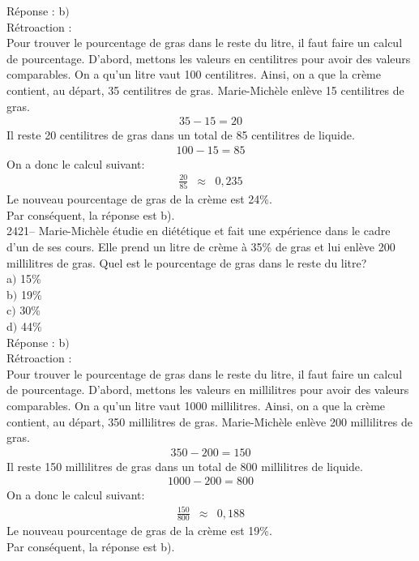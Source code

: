 \documentclass[letterpaper, 12pt]{article}
\begin{document}
R\'eponse : b$)$\\

R\'etroaction :\\
Pour trouver le pourcentage de gras dans le reste du litre, il faut faire un calcul de pourcentage. D'abord, mettons les valeurs en centilitres pour avoir des valeurs comparables. On a qu'un litre vaut 100 centilitres. Ainsi, on a que la cr\`eme contient, au d\'epart, 35 centilitres de gras. Marie-Mich\`ele enl\`eve 15 centilitres de gras.
\begin{eqnarray*}
 35-15=20
\end{eqnarray*}
Il reste 20 centilitres de gras dans un total de 85 centilitres de liquide.
\begin{eqnarray*}
100-15=85
\end{eqnarray*}
On a donc le calcul suivant:
\begin{eqnarray*}
 \frac{20}{85}&\approx&0,235
\end{eqnarray*}
Le nouveau pourcentage de gras de la cr\`eme est 24\%.\\
Par cons\'equent, la r\'eponse est b).\\

2421-- Marie-Mich\`ele \'etudie en di\'et\'etique et fait une exp\'erience dans le cadre d'un de ses cours. Elle prend un litre de cr\`eme \`a 35\% de gras et lui enl\`eve 200 millilitres de gras. Quel est le pourcentage de gras dans le reste du litre?\\

a$)$ 15\%\\
b$)$ 19\%\\
c$)$ 30\%\\
d$)$ 44\%\\

R\'eponse : b$)$\\

R\'etroaction :\\
Pour trouver le pourcentage de gras dans le reste du litre, il faut faire un calcul de pourcentage. D'abord, mettons les valeurs en millilitres pour avoir des valeurs comparables. On a qu'un litre vaut 1000 millilitres. Ainsi, on a que la cr\`eme contient, au d\'epart, 350 millilitres de gras. Marie-Mich\`ele enl\`eve 200 millilitres de gras.
\begin{eqnarray*}
350-200=150
\end{eqnarray*}
Il reste 150 millilitres de gras dans un total de 800 millilitres de liquide.
\begin{eqnarray*}
1000-200=800
\end{eqnarray*}
On a donc le calcul suivant:
\begin{eqnarray*}
 \frac{150}{800}&\approx&0,188
\end{eqnarray*}
Le nouveau pourcentage de gras de la cr\`eme est 19\%.\\
Par cons\'equent, la r\'eponse est b).\\
\end{document}
